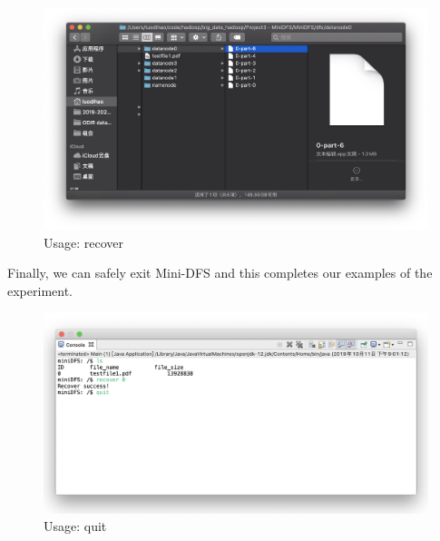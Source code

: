 \documentclass[10pt]{article}
\begin{document}
\begin{figure}[H]
\centerline{\includegraphics[width = 1\textwidth]{screenshot//recover_03.png}}
\caption{Usage: recover}
\end{figure}

Finally, we can safely exit Mini-DFS and this completes our examples of the experiment.

\begin{figure}[H]
\centerline{\includegraphics[width = 1\textwidth]{screenshot//quit_01.png}}
\caption{Usage: quit}
\end{figure}

\end{document}
